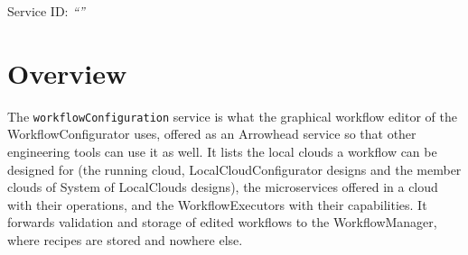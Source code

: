 \documentclass[a4paper]{arrowhead}
\begin{document}
\ArrowheadSetup

\begin{center}
  \vspace*{1cm}
  \huge{\arrowtitle}

  \vspace*{0.2cm}
  \LARGE{\arrowtype}
  \vspace*{1cm}

  \Large{Service ID: \textit{``\arrowid''}}
  \vspace*{\fill}

  

  \vspace*{1cm}
  \vspace*{\fill}

  \begin{abstract}
    This document describes the \texttt{workflowConfiguration} service of the Eclipse Arrowhead workflow support systems, which lists configured local clouds, their microservices and executors, and validates and stores edited workflows. It is provided by the WorkflowConfigurator system, service version 1.0.0, documentation edition 5.4.0.
  \end{abstract}

  \vspace*{1cm}
\end{center}

\newpage

\tableofcontents
\newpage

\section{Overview}
\label{sec:overview}
The \texttt{workflowConfiguration} service is what the graphical workflow editor of the
WorkflowConfigurator uses, offered as an Arrowhead service so that other engineering tools can use it as well. It
lists the local clouds a workflow can be designed for (the running cloud, LocalCloudConfigurator designs and the member
clouds of System of LocalClouds designs), the microservices offered in a cloud with their operations, and the
WorkflowExecutors with their capabilities. It forwards validation and storage of edited workflows to the
WorkflowManager, where recipes are stored and nowhere else.
\end{document}
